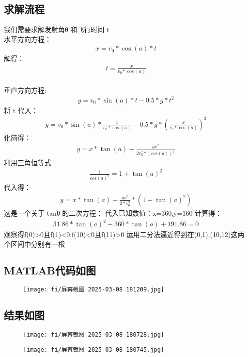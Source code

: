 \documentclass{article}
\begin{document}
\subsection{求解流程}
我们需要求解发射角θ 和飞行时间 t
\\ \indent 水平方向方程：
\begin{eqnarray}
    x=v_0*\cos(a)*t
\end{eqnarray}
解得：
\begin{eqnarray}
   t=\frac{x}{v_0*\cos(a)}
\end{eqnarray}
\\ \indent 垂直方向方程:
\begin{eqnarray}
    y=v_0*\sin(a)*t-0.5*g*t^2
\end{eqnarray}
将 t 代入：
\begin{eqnarray}
    y=v_0*\sin(a)*\frac{x}{v_0*\cos(a)}-0.5*g*(\frac{x}{v_0*\cos(a)})^2
\end{eqnarray}
化简得：
\begin{eqnarray}
    y=x*\tan(a)-\frac{gx^2}{2v_0^2*(cos(a))^2}
\end{eqnarray}
利用三角恒等式 
\begin{eqnarray}
    \frac{1}{cos(a)^2}=1+\tan(a)^2
\end{eqnarray}
代入得：
\begin{eqnarray}
    y=x*\tan(a)-\frac{gx^2}{2*v_0^2}*(1+\tan(a)^2)
\end{eqnarray}
这是一个关于 tanθ 的二次方程：
代入已知数值：x=360,y=160
计算得：
\begin{eqnarray}
    31.86*\tan(a)^2-360*\tan(a)+191.86=0
\end{eqnarray}
观察得f(0)>0且f(1)<0,f(10)<0且f(11)>0
运用二分法逼近得到在(0,1),(10,12)这两个区间中分别有一根

\subsection{MATLAB代码如图}
\begin{figure}[h]
    \centering
    \texttt{[image: fi/屏幕截图 2025-03-08 181209.jpg]}
\end{figure}
\subsection {结果如图}
\begin{figure}[h]%
	\centering
	\begin{minipage}{0.48\textwidth}
		\centering
		\texttt{[image: fi/屏幕截图 2025-03-08 180728.jpg]}
	\end{minipage}
	\hspace{0cm}%
	\hfill%
	\begin{minipage}{0.48\textwidth}
		\centering
		\texttt{[image: fi/屏幕截图 2025-03-08 180745.jpg]}
	\end{minipage}
\end{figure}
\end{document}
